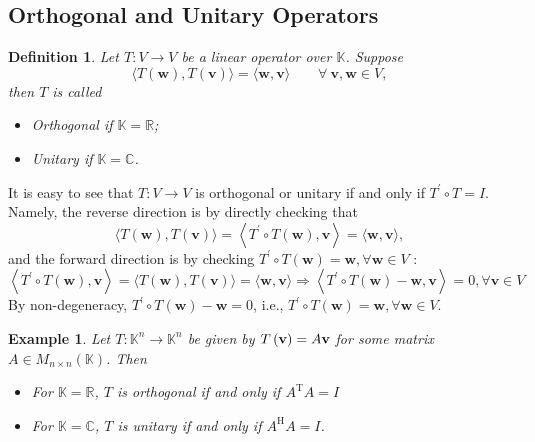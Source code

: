 \documentclass[11pt]{article}
\newtheorem{definition}[theorem]{Definition}
\newtheorem{example}[theorem]{Example}
\begin{document}
\subsection{Orthogonal and Unitary Operators}
\begin{definition} Let \(T : V \rightarrow  V\) be a linear operator over \(\mathbb{K}\). Suppose 
\[\langle T\left( \mathbf{w}\right) ,T\left( \mathbf{v}\right) \rangle  = \langle \mathbf{w},\mathbf{v}\rangle \quad \quad \forall\ \mathbf{v},\mathbf{w} \in  V,\] 
then $T$ is called 
\begin{itemize}
    \item Orthogonal if \(\mathbb{K} = \mathbb{R}\);
    \item Unitary if \(\mathbb{K} = \mathbb{C}\).
\end{itemize}
\end{definition}

It is easy to see that \(T: V \to V\) is orthogonal or unitary if and only if \({T}^{\prime } \circ  T = I\). Namely, the reverse direction is by directly checking that
\[
\langle T\left( \mathbf{w}\right) ,T\left( \mathbf{v}\right) \rangle  = \left\langle  {{T}^{\prime } \circ  T\left( \mathbf{w}\right) ,\mathbf{v}}\right\rangle   = \langle \mathbf{w},\mathbf{v}\rangle,
\]
and the forward direction is by checking \({T}^{\prime } \circ  T\left( \mathbf{w}\right)  = \mathbf{w},\forall \mathbf{w} \in  V\) :
\[
\left\langle  {{T}^{\prime } \circ  T\left( \mathbf{w}\right) ,\mathbf{v}}\right\rangle   = \langle T\left( \mathbf{w}\right) ,T\left( \mathbf{v}\right) \rangle  = \langle \mathbf{w},\mathbf{v}\rangle  \Rightarrow  \left\langle  {{T}^{\prime } \circ  T\left( \mathbf{w}\right)  - \mathbf{w},\mathbf{v}}\right\rangle   = 0,\forall \mathbf{v} \in  V
\]
By non-degeneracy, \({T}^{\prime } \circ  T\left( \mathbf{w}\right)  - \mathbf{w} = 0\), i.e., \({T}^{\prime } \circ  T\left( \mathbf{w}\right)  = \mathbf{w},\forall \mathbf{w} \in  V\).

\begin{example} Let \(T : {\mathbb{K}}^n \rightarrow  {\mathbb{K}}^n\) be given by \(T\left( \bf v\right)  = {A\bf v}\) for some matrix $A \in M_{n \times n}(\mathbb{K})$. Then 
\begin{itemize}
\item For $\mathbb{K} = \mathbb{R}$, \(T\) is orthogonal if and only if \({A}^{\mathrm{T}}A = I\) 
\item For $\mathbb{K} = \mathbb{C}$, \(T\) is unitary if and only if \({A}^{\mathrm{H}}A = I\).
\end{itemize}
\end{example}
\end{document}
